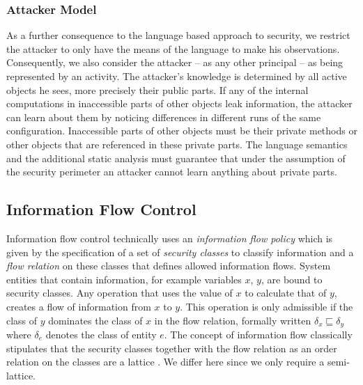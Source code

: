 \documentclass[10pt, conference, compsocconf]{IEEEtran}
\begin{document}
{\subsubsection*{Attacker Model}
As a further consequence to the language based approach to security, we restrict the attacker to only have
the means of the language to make his observations.
Consequently, we also consider the attacker -- as any other principal -- as being represented 
by an activity. The attacker's knowledge is determined by all active objects he sees, 
more precisely their public parts. If any of the internal computations in inaccessible parts of other objects leak information,
the attacker can learn about them by noticing differences in different runs of the same
configuration. 
Inaccessible parts of other objects must be their private methods
or other objects 
that are referenced in these private 
parts.
The language semantics and the additional static analysis must guarantee that under the
assumption of the security perimeter an attacker cannot learn anything about private parts.


\subsection{Information Flow Control}
\label{sec:ifcao}
Information flow control \cite{dd:77} technically uses an {\it information flow policy} 
which is given by the specification of a set of {\it security classes} to classify 
information and a {\it flow relation} on these classes that defines 
allowed information flows. System entities that contain information, for example variables $x$, $y$,
are bound to security classes. Any operation that uses the value of $x$ to calculate that of $y$, creates a flow of information from $x$ to $y$.
This operation is only admissible if the class of $y$ dominates the class of $x$ in the flow relation,
formally written $\delta_x \sqsubseteq \delta_y$ where $\delta_e$ denotes the class of entity $e$.
The concept of information flow classically stipulates that the security classes together with 
the flow relation as an order relation on the classes are a lattice \cite{de:76,dp:02}. We differ here
since we only require a semi-lattice.

}
\end{document}
